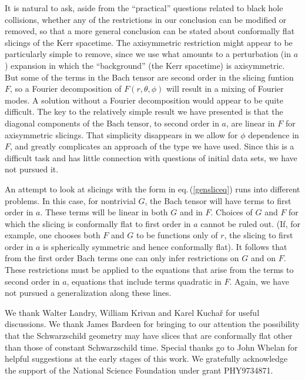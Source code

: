 It is natural to ask, aside from the ``practical'' questions related
to black hole collisions, whether any of the restrictions in our
conclusion can be modified or removed, so that a more general
conclusion can be stated about conformally flat slicings of the Kerr
spacetime.  The axisymmetric restriction might appear to be
particularly simple to remove, since we use what amounts to a
perturbation (in $a$) expansion in which the ``background'' (the Kerr
spacetime) is axisymmetric.  But some of the terms in the Bach tensor
are second order in the slicing funtion $F$, so a Fourier decomposition of
$F(r,\theta,\phi)$ will result in a mixing of Fourier modes.  A
solution without a Fourier decomposition would appear to be quite
difficult. The key to the relatively simple result we have presented
is that the diagonal components of the Bach tensor, to second order in
$a$, are linear in $F$ for axisymmetric slicings. That simplicity
disappears in we allow for $\phi$ dependence in $F$, and greatly
complicates an approach of the type we have used. Since this is a
difficult task and has little connection with questions of initial
data sets, we have not pursued it.

An attempt to look at slicings with the form in eq.\,(\ref{gensliceq})
runs into different problems. In this case, for nontrivial $G$, the
Bach tensor will have terms to first order in $a$. These terms will be
linear in both $G$ and in $F$.  Choices of $G$ and $F$ for which the
slicing is conformally flat to first order in $a$ cannot be ruled
out. (If, for example, one chooses both $F$ and $G$ to be functions
only of $r$, the slicing to first order in $a$ is spherically
symmetric and hence conformally flat). It follows that from the first
order Bach terms one can only infer
 restrictions on $G$ and on $F$.
These restrictions must be applied to the equations that 
arise from the terms to second order in $a$, equations that include 
terms quadratic in $F$. Again, we have not pursued a generalization 
along these lines.


\acknowledgments We thank Walter Landry, William Krivan and Karel
Kucha\v{r} for useful discussions. We thank James Bardeen for bringing 
to our attention the possibility that the Schwarzschild geometry
may have slices that are conformally flat other than those of constant
Schwarzschild time.
Special thanks go to John Whelan
for helpful suggestions at the early stages of this work. We
gratefully acknowledge the support of the National Science Foundation
under grant PHY9734871.




